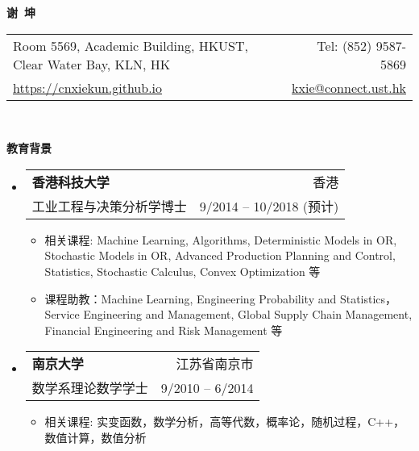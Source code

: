 \documentclass[letterpaper,9pt]{ctexart}
\makeatletter
\newcommand{\resitem}[1]{\item #1 \vspace{-2pt}}
\newcommand{\resheading}[1]{{\large \colorbox{mygrey}{\begin{minipage}{\textwidth}{\textbf{#1 \vphantom{p\^{E}}}}\end{minipage}}}}
\newcommand{\ressubheading}[4]{
\begin{tabular*}{6.5in}{l@{\extracolsep{\fill}}r}
    \textbf{#1} & #2 \\
    #3 & #4 \\
\end{tabular*}\vspace{-6pt}}
\makeatother
\begin{document}


\newcommand{\mywebheader}{
\begin{tabular*}{\linewidth}{l@{\extracolsep{\fill}}r}
    {\large Room 5569, Academic Building, HKUST, Clear Water Bay, KLN, HK} & {\large Tel: (852) 9587-5869} \\
    {\large \href{https://cnxiekun.github.io}{https://cnxiekun.github.io}} & {\large \href{mailto:kxie@connect.ust.hk}{kxie@connect.ust.hk}}
\end{tabular*}
\\
\vspace{0.15in}}

\begin{center}
    \textbf{{\huge 谢~坤}}
\end{center}

\vspace{0.1in}

\mywebheader
\quad


\resheading{教育背景}
\begin{itemize}
\item \ressubheading{香港科技大学}{香港}{工业工程与决策分析学博士}{9/2014 -- 10/2018 (预计)}

\begin{itemize}
\resitem{相关课程: Machine Learning, Algorithms, Deterministic Models in OR, Stochastic Models in OR, Advanced Production Planning and Control, Statistics, Stochastic Calculus, Convex Optimization 等}
\resitem{课程助教：Machine Learning, Engineering Probability and Statistics，Service Engineering and Management, Global Supply Chain Management, Financial Engineering and Risk Management 等}
\end{itemize}

\item \ressubheading{南京大学}{江苏省南京市}{数学系理论数学学士}{9/2010 -- 6/2014}

\begin{itemize}
\resitem{相关课程: 实变函数，数学分析，高等代数，概率论，随机过程，C++，数值计算，数值分析}
\end{itemize}

\end{itemize}
\end{document}
